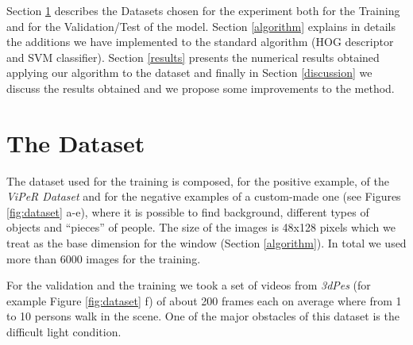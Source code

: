 \documentclass[a4paper,letterpaper, 11pt, onecolumn]{article} %
\begin{document}
Section \ref{dataset} describes the Datasets chosen for the experiment both for the Training and for the Validation/Test of the model. Section \ref{algorithm} explains in details the additions we have implemented to the standard algorithm (HOG descriptor and SVM classifier). Section \ref{results} presents the numerical results obtained applying our algorithm to the dataset and finally in Section \ref{discussion} we discuss the results obtained and we propose some improvements to the method.


\section{The Dataset}\label{dataset}
The dataset used for the training is composed, for the positive example, of the \emph{ViPeR Dataset} and for the negative examples of a custom-made one (see Figures \ref{fig:dataset} a-e), where it is possible to find background, different types of objects and ``pieces'' of people. 
The size of the images is 48x128 pixels which we treat as the base dimension for the window (Section \ref{algorithm}). In total we used more than 6000 images for the training.

For the validation and the training we took a set of videos from \emph{3dPes} (for example Figure \ref{fig:dataset} f) of about 200 frames each on average where from 1 to 10 persons walk in the scene. One of the major obstacles of this dataset is the difficult light condition.
\end{document}
